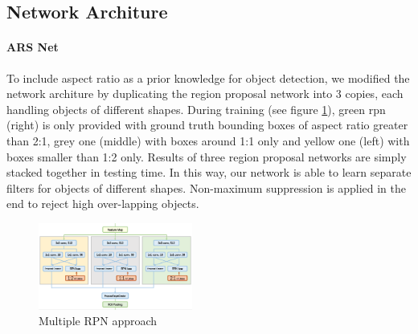 \documentclass[10pt,twocolumn,letterpaper]{article}
\begin{document}
\subsection{Network Architure}
\paragraph{ARS Net}
To include aspect ratio as a prior knowledge for object detection, we modified the network architure by duplicating the region proposal network into 3 copies, each handling objects of different shapes. During training (see figure \ref{ARS_De}), green rpn (right) is only provided with ground truth bounding boxes of aspect ratio greater than 2:1, grey one (middle) with boxes around 1:1 only and yellow one (left) with boxes smaller than 1:2 only. Results of three region proposal networks are simply stacked together in testing time. In this way, our network is able to learn separate filters for objects of different shapes. Non-maximum suppression is applied in the end to reject high over-lapping objects. 
    \begin{figure}[!htb]
    \includegraphics[width= 0.45\textwidth]{pic/ARS-archi-detail.png}
    \caption{Multiple RPN approach}
    \label{ARS_De}
    \end{figure}
\end{document}
